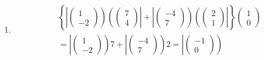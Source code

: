 \documentclass[aps,preprint]{revtex4}
\begin{document}
\begin{enumerate}
\item 
\begin{align}
& \left\{ \left\vert \left( 
\begin{array}{c}
1 \\ 
-2%
\end{array}%
\right) \right) \left( \left( 
\begin{array}{c}
7 \\ 
4%
\end{array}%
\right) \right\vert +\left\vert \left( 
\begin{array}{c}
-4 \\ 
7%
\end{array}%
\right) \right) \left( \left( 
\begin{array}{c}
2 \\ 
1%
\end{array}%
\right) \right\vert \right\} \left( 
\begin{array}{c}
1 \\ 
0%
\end{array}%
\right) \\
& =\left\vert \left( 
\begin{array}{c}
1 \\ 
-2%
\end{array}%
\right) \right) 7+\left\vert \left( 
\begin{array}{c}
-4 \\ 
7%
\end{array}%
\right) \right) 2=\left\vert \left( 
\begin{array}{c}
-1 \\ 
0%
\end{array}%
\right) \right)
\end{align}


\end{enumerate}
\end{document}
